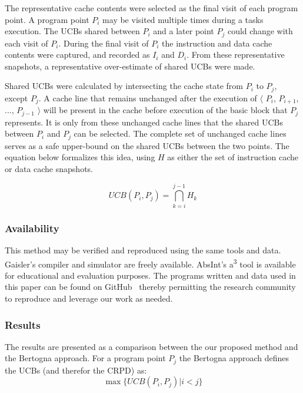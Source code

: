 The representative cache contents were selected as the final visit of
each program point. A program point ${P_i}$ may be visited multiple
times during a tasks execution. The UCBs shared between ${P_i}$ and a
later point ${P_j}$ could change with each visit of ${P_i}$. During
the final visit of ${P_i}$ the instruction and data cache contents
were captured, and recorded as ${I_i}$ and ${D_i}$. From these
representative snapshots, a representative over-estimate of shared
UCBs were made.

Shared UCBs were calculated by intersecting the cache state from ${P_i}$
to ${P_j}$, except ${P_j}$. A cache line that remains unchanged after
the execution of ${\langle}$ ${P_i}$, ${P_{i+1}}$, ..., ${P_{j-1}}$
${\rangle}$ will be
present in the cache before execution of the basic block that ${P_j}$
represents. It is only from these unchanged cache lines that the shared UCBs
between ${P_i}$ and ${P_j}$ can be selected. The complete set of
unchanged cache lines serves as a safe upper-bound on the shared UCBs
between the two points. The equation below formalizes this idea, using
${H}$ as either the set of instruction cache or data cache snapshots.
\vspace{-20pt}
\begin{center}
  \begin{equation*}
    UCB(P_i, P_j) = \bigcap_{k=i}^{j-1} H_k
  \end{equation*}
\end{center}
\subsubsection{Availability}
This method may be verified and reproduced using the same tools and
data. Gaisler's compiler and simulator are freely available. AbsInt's
a\textsuperscript{3} tool is available for educational and evaluation
purposes. The programs written and data used in this paper can be
found on GitHub~\cite{tessler:14} thereby permitting the research community
to reproduce and leverage our work as needed.

\subsubsection{Results}
The results are presented as a comparison between the our proposed
method and the Bertogna approach. For a program point ${P_j}$ the
Bertogna \cite{bertogna:11} approach defines the UCBs (and therefor the CRPD) as:
\begin{equation*}
  \max\{ UCB(P_i, P_j) \vert i < j \}
\end{equation*}


